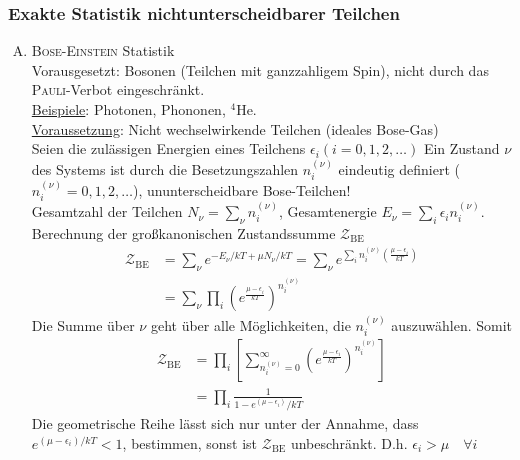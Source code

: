 \subsubsection{Exakte Statistik nichtunterscheidbarer Teilchen}
\begin{enumerate}[A)]
    \item \textsc{Bose-Einstein} Statistik \\
    Vorausgesetzt: Bosonen (Teilchen mit ganzzahligem Spin), nicht durch das \textsc{Pauli}-Verbot eingeschränkt. \\
    \underline{Beispiele}: Photonen, Phononen, $^4$He.\\
    \underline{Voraussetzung}: Nicht wechselwirkende Teilchen (ideales Bose-Gas)\\
    Seien die zulässigen Energien eines Teilchens $\epsilon_i (i= 0, 1, 2, \ldots)$ Ein Zustand $\nu$ des Systems ist durch die
    Besetzungszahlen $n_i^{(\nu)}$ eindeutig definiert ($n_i^{(\nu)} = 0, 1, 2, \ldots$), ununterscheidbare Bose-Teilchen! \\
    Gesamtzahl der Teilchen $N_\nu = \sum_\nu n_i^{(\nu)}$, Gesamtenergie $E_\nu = \sum_i \epsilon_i n_i^{(\nu)}$. \\
    Berechnung der großkanonischen Zustandssumme $\mathcal{Z}_\text{BE}$
    \begin{equation}
        \begin{split}
            \mathcal{Z}_\text{BE} &= \sum_\nu e^{- E_\nu / kT + \mu N_\nu / k T} = \sum_\nu e^{\sum_i n_i^{(\nu)} \left( \frac{\mu - \epsilon_i}{k T} \right) } \\
            &= \sum_\nu \prod_i \left( e^{\frac{\mu - \epsilon_i}{k T}} \right)^{n_i^{(\nu)}}
        \end{split}
    \end{equation}
    Die Summe über $\nu$ geht über alle Möglichkeiten, die $n_i^{(\nu)}$ auszuwählen. Somit
    \begin{equation}
        \begin{split}
            \mathcal{Z}_\text{BE} &= \prod_i \left[ \sum_{n_i^{(\nu)} = 0}^{\infty} \left( e^{\frac{\mu - \epsilon_i}{k T}} \right)^{n_i^{(\nu)}} \right] \\
            &= \prod_i \frac{1}{1 - e^{(\mu - \epsilon_i)} / k T}
        \end{split}
    \end{equation}
    Die geometrische Reihe lässt sich nur unter der Annahme, dass $e^{(\mu - \epsilon_i) / kT} < 1$, bestimmen,
    sonst ist $\mathcal{Z}_\text{BE}$ unbeschränkt. D.h. $\epsilon_i > \mu \quad \forall i$ \\

\end{enumerate}
